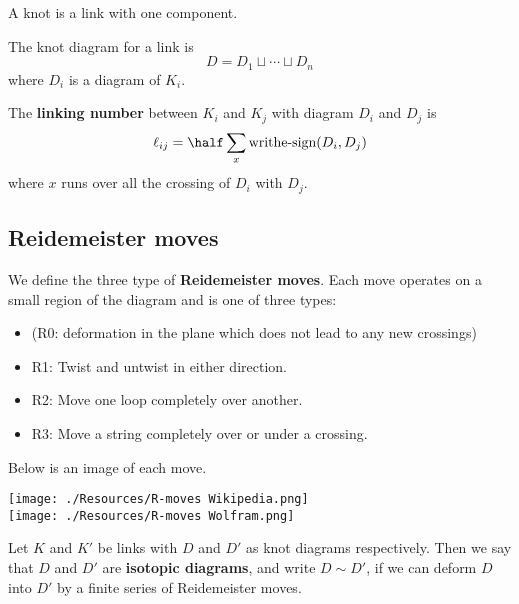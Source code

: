 \documentclass[12pt, a4paper]{article}
\begin{document}
\begin{mdremark}
    A knot is a link with one component.
\end{mdremark}

\begin{definition}
    The knot diagram for a link is
    \[D = D_1 \sqcup \cdots \sqcup D_n\]
    where \(D_i\) is a diagram of \(K_i\).
\end{definition}

\begin{definition}
    The \textbf{linking number} between \(K_i\) and \(K_j\) with diagram \(D_i\) and \(D_j\) is 
    \[\ell_{ij} = \half \sum_x \text{writhe-sign}(D_i,D_j)\]
    where \(x\) runs over all the crossing of \(D_i\) with \(D_j\).
\end{definition}

\subsection{Reidemeister moves}

\begin{definition}
    We define the three type of \textbf{Reidemeister moves}. Each move operates on a small region of the diagram and is one of three types:
    \begin{itemize}
        \item (R0: deformation in the plane which does not lead to any new crossings)
        \item R1: Twist and untwist in either direction.
        \item R2: Move one loop completely over another.
        \item R3: Move a string completely over or under a crossing.
    \end{itemize}
    Below is an image of each move. \\
    \begin{center}
        \texttt{[image: ./Resources/R-moves Wikipedia.png]} \\
        \texttt{[image: ./Resources/R-moves Wolfram.png]}
    \end{center}
\end{definition}

\begin{definition}
    Let \(K\) and \(K'\) be links with \(D\) and \(D'\) as knot diagrams respectively. Then we say that \(D\) and \(D'\) are \textbf{isotopic diagrams}, and write \(D \sim D'\), if we can deform \(D\) into \(D'\) by a finite series of Reidemeister moves.
\end{definition}
\end{document}
